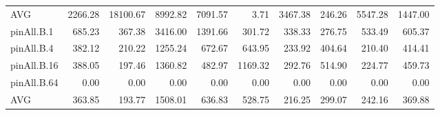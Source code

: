 \begin{table*}[]
\begin{center}
\begin{tabular}{lrrrrrrrrr}
 AVG          &  2266.28 & 18100.67 &  8992.82 &  7091.57 &    3.71 &  3467.38 & 246.26 &  5547.28 & 1447.00 \\
 pinAll.B.1   &   685.23 &   367.38 &  3416.00 &  1391.66 &  301.72 &   338.33 & 276.75 &   533.49 &  605.37 \\
 pinAll.B.4   &   382.12 &   210.22 &  1255.24 &   672.67 &  643.95 &   233.92 & 404.64 &   210.40 &  414.41 \\
 pinAll.B.16  &   388.05 &   197.46 &  1360.82 &   482.97 & 1169.32 &   292.76 & 514.90 &   224.77 &  459.73 \\
 pinAll.B.64  &     0.00 &     0.00 &     0.00 &     0.00 &    0.00 &     0.00 &   0.00 &     0.00 &    0.00 \\
 AVG          &   363.85 &   193.77 &  1508.01 &   636.83 &  528.75 &   216.25 & 299.07 &   242.16 &  369.88 \\
\hline
\end{tabular}
\end{center}
\end{table*}
